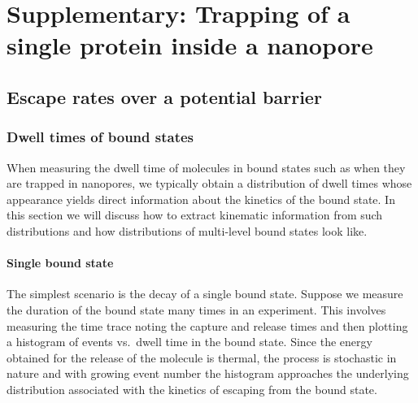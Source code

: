 \chapter{Supplementary: Trapping of a single protein inside a nanopore}
%
\label{ch:trapping_appendix}
%

%
\section{Escape rates over a potential barrier}
%
\label{sec:trapping_appendix:escape_rates}
%


\subsection{Dwell times of bound states}
%

When measuring the dwell time of molecules in bound states such as when they are trapped in nanopores, we
typically obtain a distribution of dwell times whose appearance yields direct information about the kinetics
of the bound state. In this section we will discuss how to extract kinematic information from such
distributions and how distributions of multi-level bound states look like.


\subsubsection{Single bound state}
%
\label{sec:trapping_appendix:single_bound_state}
%

The simplest scenario is the decay of a single bound state. Suppose we measure the duration of the bound state
many times in an experiment. This involves measuring the time trace noting the capture and release times and
then plotting a histogram of events vs.~dwell time in the bound state. Since the energy obtained for the
release of the molecule is thermal, the process is stochastic in nature and with growing event number the
histogram approaches the underlying distribution associated with the kinetics of escaping from the bound
state.

